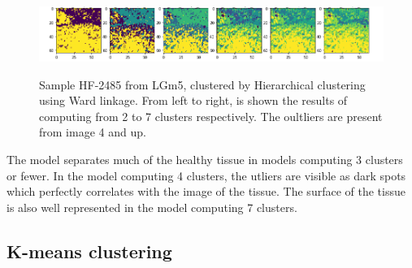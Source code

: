 \begin{figure}[h]

    \centering
{\includegraphics[width=15cm]{images/Ward_linkage/LGm-5/HF-2485_V1B_1.h5_9.png} }
\caption{Sample HF-2485 from LGm5, clustered by Hierarchical clustering using Ward linkage. From left to right, is shown the results of computing from 2 to 7 clusters respectively. The oultliers are present from image 4 and up.
\label{fig:hf_2485}}%
\end{figure}

 The model separates much of the healthy tissue in models computing 3 clusters or fewer. In the model computing 4 clusters, the utliers are visible as dark spots which perfectly correlates with the image of the tissue. The surface of the tissue is also well represented in the model computing 7 clusters.

\subsection{K-means clustering}

